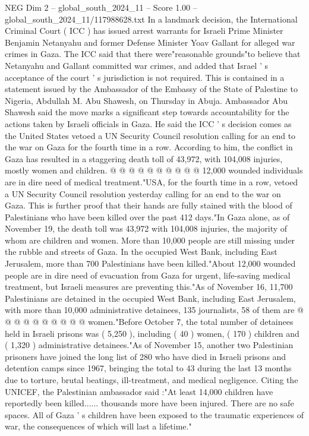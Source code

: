 \begin{textsample}{NEG Dim 2 – global\_south\_2024\_11 – Score 1.00 – global\_south\_2024\_11/117988628.txt}  \label{ex:f2_neg_268}
In a landmark decision, the International Criminal Court ( ICC ) has issued arrest warrants for Israeli Prime Minister Benjamin Netanyahu and former Defense Minister Yoav Gallant for alleged war crimes in Gaza.
The ICC said that there were"reasonable grounds"to believe that Netanyahu and Gallant committed war crimes, and added that Israel ' s acceptance of the court ' s jurisdiction is not required.
This is contained in a statement issued by the Ambassador of the Embassy of the State of Palestine to Nigeria, Abdullah M.
Abu Shawesh, on Thursday in Abuja.
Ambassador Abu Shawesh said the move marks a significant step towards accountability for the actions taken by Israeli officials in Gaza.
He said the ICC ' s decision comes as the United States vetoed a UN Security Council resolution calling for an end to the war on Gaza for the fourth time in a row.
According to him, the conflict in Gaza has resulted in a staggering death toll of 43,972, with 104,008 injuries, mostly women and children. @ @ @ @ @ @ @ @ @ @ 12,000 wounded individuals are in dire need of medical treatment."USA, for the fourth time in a row, vetoed a UN Security Council resolution yesterday calling for an end to the war on Gaza.
This is further proof that their hands are fully stained with the blood of Palestinians who have been killed over the past 412 days."In Gaza alone, as of November 19, the death toll was 43,972 with 104,008 injuries, the majority of whom are children and women.
More than 10,000 people are still missing under the rubble and streets of Gaza.
In the occupied West Bank, including East Jerusalem, more than 700 Palestinians have been killed."About 12,000 wounded people are in dire need of evacuation from Gaza for urgent, life-saving medical treatment, but Israeli measures are preventing this."As of November 16, 11,700 Palestinians are detained in the occupied West Bank, including East Jerusalem, with more than 10,000 administrative detainees, 135 journalists, 58 of them are @ @ @ @ @ @ @ @ @ @ women."Before October 7, the total number of detainees held in Israeli prisons was ( 5,250 ), including ( 40 ) women, ( 170 ) children and ( 1,320 ) administrative detainees."As of November 15, another two Palestinian prisoners have joined the long list of 280 who have died in Israeli prisons and detention camps since 1967, bringing the total to 43 during the last 13 months due to torture, brutal beatings, ill-treatment, and medical negligence.
Citing the UNICEF, the Palestinian ambassador said :"At least 14,000 children have reportedly been killed...... thousands more have been injured.
There are no safe spaces.
All of Gaza ' s children have been exposed to the traumatic experiences of war, the consequences of which will last a lifetime."

\end{textsample}
